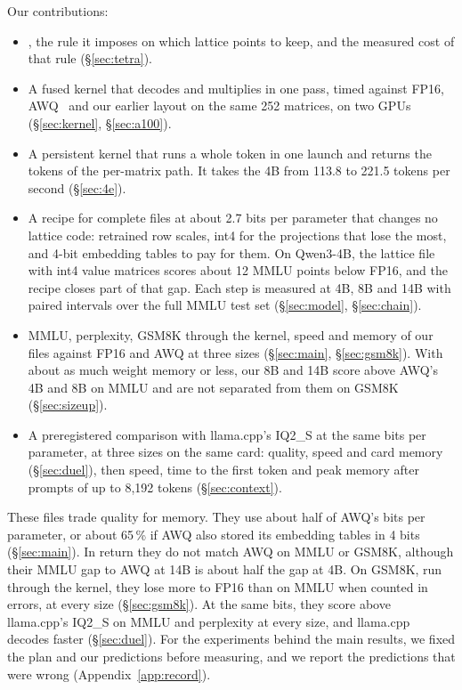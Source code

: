 Our contributions:
\begin{itemize}
\item \Tetra{}, the rule it imposes on which lattice points to keep, and the
  measured cost of that rule (\S\ref{sec:tetra}).
\item A fused kernel that decodes and multiplies in one pass, timed against
  FP16, AWQ~\citep{awq2024} and our earlier layout on the same 252 matrices,
  on two GPUs (\S\ref{sec:kernel}, \S\ref{sec:a100}).
\item A persistent kernel that runs a whole token in one launch and returns
  the tokens of the per-matrix path. It takes the 4B from 113.8 to 221.5
  tokens per second (\S\ref{sec:4e}).
\item A recipe for complete files at about 2.7 bits per parameter that changes
  no lattice code: retrained row scales, int4 for the projections that lose the
  most, and 4-bit embedding tables to pay for them. On Qwen3-4B, the lattice
  file with int4 value matrices scores about 12 MMLU points below FP16, and the
  recipe closes part of that gap. Each step is measured at 4B, 8B and 14B with
  paired intervals over the full MMLU test set (\S\ref{sec:model},
  \S\ref{sec:chain}).
\item MMLU, perplexity, GSM8K through the kernel, speed and memory of our files
  against FP16 and AWQ at three sizes (\S\ref{sec:main}, \S\ref{sec:gsm8k}).
  With about as much weight memory or less, our 8B and 14B score above AWQ's
  4B and 8B on MMLU and are not separated from them on GSM8K
  (\S\ref{sec:sizeup}).
\item A preregistered comparison with llama.cpp's IQ2\_S at the same bits per
  parameter, at three sizes on the same card: quality, speed and card memory
  (\S\ref{sec:duel}), then speed, time to the first token and peak memory
  after prompts of up to 8{,}192 tokens (\S\ref{sec:context}).
\end{itemize}

These files trade quality for memory. They use about half of AWQ's bits per
parameter, or about 65\,\% if AWQ also stored its embedding tables in 4 bits
(\S\ref{sec:main}). In return they do not match AWQ on MMLU or GSM8K, although
their MMLU gap to AWQ at 14B is about half the gap at 4B. On GSM8K, run
through the kernel, they lose more to FP16 than on MMLU when counted in
errors, at every size (\S\ref{sec:gsm8k}). At the same bits, they score above
llama.cpp's IQ2\_S on MMLU and perplexity at every size, and llama.cpp
decodes faster (\S\ref{sec:duel}). For the experiments behind the main
results, we fixed the plan and our predictions before measuring, and we report
the predictions that were wrong (Appendix~\ref{app:record}).

